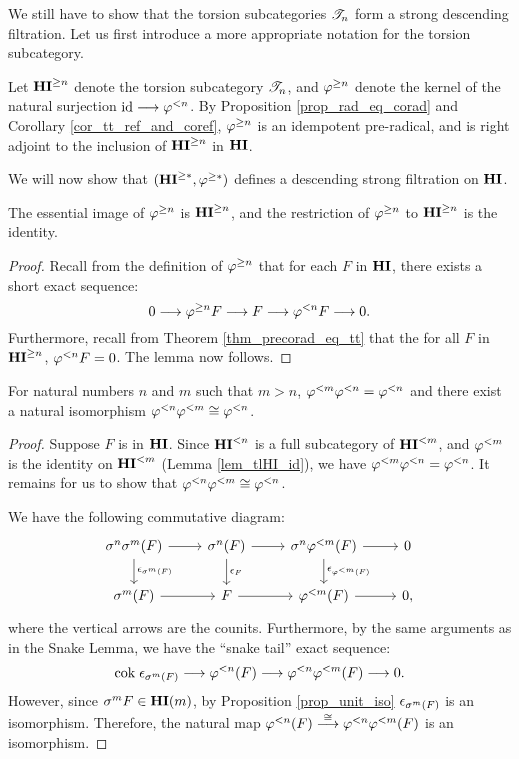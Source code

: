 We still have to show that the torsion subcategories $\Cat{T}_n$
form a strong descending filtration. Let us first introduce a more
appropriate notation for the torsion subcategory.  

\begin{defn}\label{def_upper_slice_functor}
Let $\THI{n}$ denote the torsion subcategory $\Cat{T}_n$, and
$\tgHI{n}$ denote the kernel of the natural surjection $\id 
\to \tlHI{n}$. By Proposition \ref{prop_rad_eq_corad} and 
Corollary \ref{cor_tt_ref_and_coref}, $\tgHI{n}$ is an idempotent 
pre-radical, and is right adjoint to the inclusion of $\THI{n}$ in
$\HI$.
\end{defn}

We will now show that $(\THI{*}, \tgHI{*})$ defines a descending 
strong filtration on $\HI$.

\begin{lem}\label{lem_tgHI_reflection}
The essential image of $\tgHI{n}$ is $\THI{n}$, and the 
restriction of $\tgHI{n}$ to $\THI{n}$ is the identity.
\end{lem}
\begin{proof}
Recall from the definition of $\tgHI{n}$ that for each $F$
in $\HI$, there exists a short exact sequence:
\[
0 \to \tgHI{n} F \to F \to \tlHI{n} F \to 0.
\]
Furthermore, recall from Theorem \ref{thm_precorad_eq_tt} that
the for all $F$ in $\THI{n}$, $\tlHI{n} F = 0$. The lemma now
follows.
\end{proof}

\begin{lem}\label{lem_TFHI_properties}
For natural numbers $n$ and $m$ such that $m > n$, $\tlHI{m} 
\tlHI{n} = \tlHI{n}$ and there exist a
natural isomorphism $\tlHI{n}\tlHI{m} \cong \tlHI{n}$. 
\end{lem}
\begin{proof}
Suppose $F$ is in $\HI$. Since $\TFHI{n}$ is a
full subcategory of $\TFHI{m}$, and $\tlHI{m}$ is the identity on 
$\TFHI{m}$ (Lemma \ref{lem_tlHI_id}), we have $\tlHI{m}\tlHI{n} = 
\tlHI{n}$. It remains for us to show that $\tlHI{n}\tlHI{m} \cong
\tlHI{n}$.

We have the following commutative diagram:
\begin{equation}\label{eq_sg_nat_diag}
\begin{tikzcd}
\sgHI{n}\sgHI{m}(F) \arrow{r}\arrow{d}{\cuHI_{\sgHI{m}(F)}} &
\sgHI{n}(F) \arrow{r}\arrow{d}{\cuHI_F} &
\sgHI{n}\tlHI{m}(F) \arrow{r}\arrow{d}{\cuHI_{\tlHI{m}(F)}} &
0 \\
\sgHI{m}(F) \arrow{r} &
F \arrow{r} &
\tlHI{m}(F) \arrow{r}&
0,
\end{tikzcd}
\end{equation}
where the vertical arrows are the counits. Furthermore, by the 
same arguments as in the Snake Lemma, we have the ``snake tail'' 
exact sequence:
\[
\cok \cuHI_{\sgHI{m}(F)} \to \tlHI{n}(F) \to \tlHI{n}\tlHI{m}(F) 
   \to 0.
\]
However, since $\sgHI{m}F \in \LHI[m]{\HI}$, by Proposition
\ref{prop_unit_iso} $\cuHI_{\sgHI{m}(F)}$ is an isomorphism.
Therefore, the natural map $\tlHI{n}(F) \stackrel{\cong}{\to} 
\tlHI{n}\tlHI{m}(F)$ is an isomorphism.
\end{proof}

